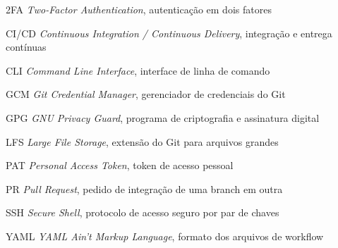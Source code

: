 \documentclass[12pt, a4paper, openright, oneside, brazil]{abntex2}
\begin{document}

\imprimircapa
\imprimirfolhaderosto

\newpage
\listoffigures

\newpage
\listoftables

\begin{siglas}
  \item[2FA] \emph{Two-Factor Authentication}, autenticação em dois fatores
  \item[CI/CD] \emph{Continuous Integration / Continuous Delivery}, integração e entrega contínuas
  \item[CLI] \emph{Command Line Interface}, interface de linha de comando
  \item[GCM] \emph{Git Credential Manager}, gerenciador de credenciais do Git
  \item[GPG] \emph{GNU Privacy Guard}, programa de criptografia e assinatura digital
  \item[LFS] \emph{Large File Storage}, extensão do Git para arquivos grandes
  \item[PAT] \emph{Personal Access Token}, token de acesso pessoal
  \item[PR] \emph{Pull Request}, pedido de integração de uma branch em outra
  \item[SSH] \emph{Secure Shell}, protocolo de acesso seguro por par de chaves
  \item[YAML] \emph{YAML Ain't Markup Language}, formato dos arquivos de workflow
\end{siglas}

\tableofcontents


\nocite{conventional_commits,adorno_commits,iuricode_commits,git_docs}   %





\end{document}
